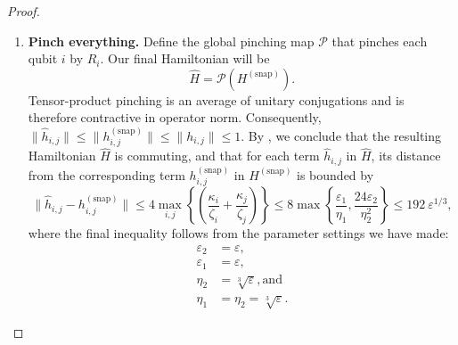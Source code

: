 \documentclass[a4paper,onecolumn,11pt]{quantumarticle}
\theoremstyle{plain}
\newcommand{\eps}{\varepsilon}
\renewcommand{\cP}{\mathcal{P}}
\newcommand{\snp}{{(\mathrm{snap})}}
\begin{document}
\begin{proof}
\begin{enumerate}
Now, we will use transitivity: we know that $\|[B_i^\beta, A_i^{\alpha^*}]\| \leq \eps_2$ and $\|[A_i^{\alpha^*}, R_i]\| \leq \eps_2$, so by , we can conclude that 
\begin{equation}
    \| [B_i^\beta, R_i] \| \leq \frac{6\eps_2}{\Delta(A_i^{\alpha^*})} \leq \frac{6 \eps_2}{\eta_2},
\end{equation}
where we are assuming that $\eps_2 \leq \eta_2$ and moreover that the terms of the Hamiltonian have operator norm at most $1$. So, we have
\[ \| [h^\snp_{i,k}, R_i \otimes I_k ] \| \leq \frac{24\eps_2}{\eta_2}. \]
    \item \textbf{Pinch everything.} Define the global pinching map $\cP$ that pinches each qubit $i$ by $R_i$. Our final Hamiltonian will be
    \[ \widehat{H} = \cP(H^\snp).\]
    Tensor-product pinching is an average of unitary conjugations and is therefore contractive in operator norm. Consequently, $\|\hat{h}_{i,j}\|\leq\|h^\snp_{i,j}\|\leq\|h_{i,j}\|\leq 1$.
    By , we conclude that the resulting Hamiltonian $\widehat{H}$ is commuting, and that for each term $\widehat{h}_{i,j}$ in $\widehat{H}$, its distance from the corresponding term $h^\snp_{i,j}$ in $H^\snp$ is bounded by 
    \[ \|\hat{h}_{i,j} - h^\snp_{i,j} \| \leq  4\max_{i,j} \left\{ \left(\frac{\kappa_i}{\zeta_i} + \frac{\kappa_j}{\zeta_j} \right) \right\} \leq 8 \max\left\{ \frac{\eps_1}{\eta_1}, \frac{24\eps_2}{\eta_2^2} \right\} \leq 192\ \eps^{1/3}, \]
where the final inequality follows from the parameter settings we have made:
    \begin{align}
        \eps_2 &= \eps,\\
        \eps_1 &= \eps,\\
        \eta_2 &= \sqrt[3]{\eps}, \text{and}\label{ineq:eta_2}\\
        \eta_1 &= \eta_2 = \sqrt[3]{\eps}.\label{ineq:eta_1}
    \end{align}
\end{enumerate}



\end{proof}
\end{document}
